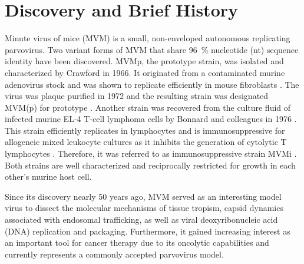 
\chapter{Discovery and Brief History} %

\label{Chapter1} %


\graphicspath{{./Pictures/}}

\label{sec:Discovery and brief history}
Minute virus of mice (MVM) is a small, non-enveloped autonomous replicating parvovirus. Two variant forms of MVM that share 96~\% nucleotide (nt) sequence identity \cite{pmid3855242} have been discovered. 
MVMp\footnotemark, the prototype strain, was isolated and characterized by Crawford in 1966. It originated from a contaminated murine adenovirus stock and was shown to replicate efficiently in mouse fibroblasts \cite{pmid5945715}. The virus was plaque purified in 1972 \cite{pmid4673484} and the resulting strain was designated MVM(p) for prototype \cite{MVMp}. Another strain was recovered from the culture fluid of infected murine EL-4 T-cell lymphoma cells by Bonnard and colleagues in 1976 \cite{pmid1244418}. This strain efficiently replicates in lymphocytes and is immunosuppressive for allogeneic mixed leukocyte cultures as it inhibits the generation of cytolytic T lymphocytes \cite{pmid6457871}. Therefore, it was referred to as immunosuppressive strain MVMi \cite{pmid6264106}. Both strains are well characterized and reciprocally restricted for growth in each other’s murine host cell.  

Since its discovery nearly 50 years ago, MVM served as an interesting model virus to dissect the molecular mechanisms of tissue tropism, capsid dynamics associated with endosomal trafficking, as well as viral deoxyribonucleic acid (DNA) replication and packaging. Furthermore, it gained increasing interest as an important tool for cancer therapy due to its oncolytic capabilities and currently represents a commonly accepted parvovirus model.     

